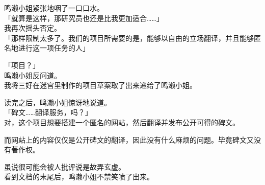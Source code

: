 鸣濑小姐紧张地咽了一口口水。\\

「就算是这样，那研究员也还是比我更加适合……」\\

我再次摇头否定。\\

「那样限制太多了。我们的项目所需要的是，能够以自由的立场翻译，并且能够匿名地进行这一项任务的人」

「项目？」\\

鸣濑小姐反问道。\\

我将三好在迷宫里制作的项目草案取了出来递给了鸣濑小姐。

读完之后，鸣濑小姐惊讶地说道。\\

「碑文……翻译服务，吗？」\\

对，这个项目想要搭建一个匿名的网站，然后翻译并发布公开可得的碑文。

而网站上的内容仅仅是公开碑文的翻译，因此没有什么麻烦的问题。毕竟碑文又没有著作权。

虽说很可能会被人批评说是故弄玄虚。\\

看到文档的末尾后，鸣濑小姐不禁笑喷了出来。\\


